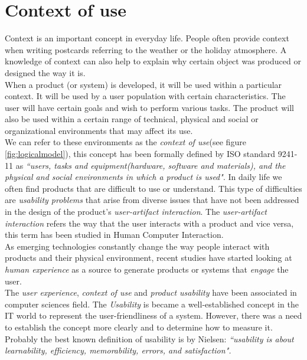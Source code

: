 \section{Context of use}\label{contextofuse}

Context is an important concept in everyday life. People often provide
context when writing postcards referring to the weather or the holiday
atmosphere. A knowledge of context can also help to explain why certain
object was produced or designed the way it is.\\ When a product (or system) is developed, it
will be used within a particular context. It will be used by a user
population with certain characteristics. The user will have certain
goals and wish to perform various tasks. The product will also be used
within a certain range of technical, physical and social or
organizational environments\cite{maguire2001context} that may affect
its use.\\   
We can refer to these environments as the \textit{context of use}(see
figure \ref{fig:logicalmodel}), this concept has been formally defined
by ISO standard 9241-11\cite{international1998iso} as \textit{``users,
tasks and equipment(hardware, software and materials), and the
physical and social environments in which a product is used"}. 
In daily life we often find products that are difficult to use or
understand. This type of difficulties are \textit{usability problems}
that arise from  diverse issues that have not been addressed in the
design of the product's \textit{user-artifact interaction}. The
\textit{user-artifact interaction} refers the way that the user
interacts with a product and vice versa, this term has been studied
in Human Computer Interaction. \\As emerging technologies constantly
change the way people interact with products and their physical
environment, recent studies have started looking at \textit{human
experience} as a source to generate products or systems that
\textit{engage} the user.\\
The \textit{user experience}, \textit{context of use} and
\textit{product usability} have been associated in computer sciences
field. The \textit{Usability} is became a well-established concept in
the IT world to represent the user-friendliness of a system. However,
there was a need to establish the concept more clearly and to
determine how to measure it. Probably the best known definition of
usability is by Nielsen\cite{nielsen1994usability}: 
\textit{``usability is about learnability, efficiency, 
memorability, errors, and satisfaction".}
